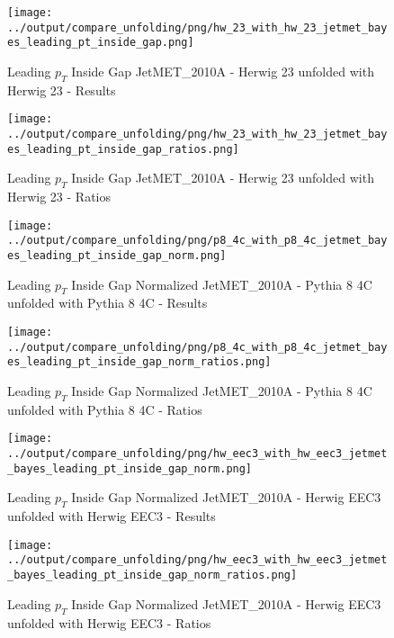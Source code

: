 \documentclass[11pt]{book}
\begin{document}
\begin{figure}[ht]
\centering
\texttt{[image: ../output/compare\_unfolding/png/hw\_23\_with\_hw\_23\_jetmet\_bayes\_leading\_pt\_inside\_gap.png]}
\caption{Leading $p_{T}$ Inside Gap JetMET\_2010A - Herwig 23 unfolded with Herwig 23 - Results}
\label{hw_23_hw_23_jetmet_bayes_leading_pt_inside_gap_a}
\end{figure}

\begin{figure}[ht]
\centering
\texttt{[image: ../output/compare\_unfolding/png/hw\_23\_with\_hw\_23\_jetmet\_bayes\_leading\_pt\_inside\_gap\_ratios.png]}
\caption{Leading $p_{T}$ Inside Gap JetMET\_2010A - Herwig 23 unfolded with Herwig 23 - Ratios}
\label{hw_23_hw_23_jetmet_bayes_leading_pt_inside_gap_b}
\end{figure}


\begin{figure}[ht]
\centering
\texttt{[image: ../output/compare\_unfolding/png/p8\_4c\_with\_p8\_4c\_jetmet\_bayes\_leading\_pt\_inside\_gap\_norm.png]}
\caption{Leading $p_{T}$ Inside Gap Normalized JetMET\_2010A - Pythia 8 4C unfolded with Pythia 8 4C - Results}
\label{p8_p8_jetmet_bayes_leading_pt_inside_gap_norm_a}
\end{figure}

\begin{figure}[ht]
\centering
\texttt{[image: ../output/compare\_unfolding/png/p8\_4c\_with\_p8\_4c\_jetmet\_bayes\_leading\_pt\_inside\_gap\_norm\_ratios.png]}
\caption{Leading $p_{T}$ Inside Gap Normalized JetMET\_2010A - Pythia 8 4C unfolded with Pythia 8 4C - Ratios}
\label{p8_p8_jetmet_bayes_leading_pt_inside_gap_norm_b}
\end{figure}

\begin{figure}[ht]
\centering
\texttt{[image: ../output/compare\_unfolding/png/hw\_eec3\_with\_hw\_eec3\_jetmet\_bayes\_leading\_pt\_inside\_gap\_norm.png]}
\caption{Leading $p_{T}$ Inside Gap Normalized JetMET\_2010A - Herwig EEC3 unfolded with Herwig EEC3 - Results}
\label{hw_eec3_hw_eec3_jetmet_bayes_leading_pt_inside_gap_norm_a}
\end{figure}

\begin{figure}[ht]
\centering
\texttt{[image: ../output/compare\_unfolding/png/hw\_eec3\_with\_hw\_eec3\_jetmet\_bayes\_leading\_pt\_inside\_gap\_norm\_ratios.png]}
\caption{Leading $p_{T}$ Inside Gap Normalized JetMET\_2010A - Herwig EEC3 unfolded with Herwig EEC3 - Ratios}
\label{hw_eec3_hw_eec3_jetmet_bayes_leading_pt_inside_gap_norm_b}
\end{figure}
\end{document}
